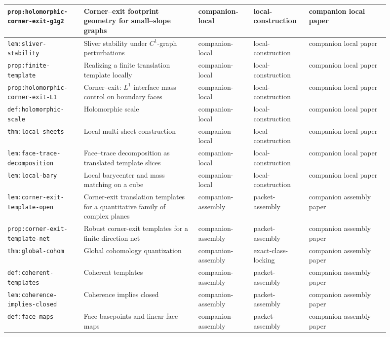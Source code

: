 \documentclass[11pt]{article}
\numberwithin{equation}{section}  %
\theoremstyle{plain}
\theoremstyle{definition}
\theoremstyle{remark}
\begin{document}
\begin{longtable}{|p{0.18\linewidth}|p{0.27\linewidth}|p{0.13\linewidth}|p{0.13\linewidth}|p{0.19\linewidth}|}
\texttt{prop:holomorphic-corner-exit-g1g2} & {Corner--exit footprint geometry for small--slope graphs} & companion-local & local-construction & companion local paper \\ \hline
\texttt{lem:sliver-stability} & Sliver stability under $C^1$-graph perturbations & companion-local & local-construction & companion local paper \\ \hline
\texttt{prop:finite-template} & Realizing a finite translation template locally & companion-local & local-construction & companion local paper \\ \hline
\texttt{prop:holomorphic-corner-exit-L1} & {Corner--exit: $L^1$ interface mass control on boundary faces} & companion-local & local-construction & companion local paper \\ \hline
\texttt{def:holomorphic-scale} & Holomorphic scale & companion-local & local-construction & companion local paper \\ \hline
\texttt{thm:local-sheets} & Local multi-sheet construction & companion-local & local-construction & companion local paper \\ \hline
\texttt{lem:face-trace-decomposition} & Face--trace decomposition as translated template slices & companion-local & local-construction & companion local paper \\ \hline
\texttt{lem:local-bary} & Local barycenter and mass matching on a cube & companion-local & local-construction & companion local paper \\ \hline
\texttt{lem:corner-exit-template-open} & Corner-exit translation templates for a quantitative family of complex planes & companion-assembly & packet-assembly & companion assembly paper \\ \hline
\texttt{prop:corner-exit-template-net} & Robust corner-exit templates for a finite direction net & companion-assembly & packet-assembly & companion assembly paper \\ \hline
\texttt{thm:global-cohom} & Global cohomology quantization & companion-assembly & exact-class-locking & companion assembly paper \\ \hline
\texttt{def:coherent-templates} & Coherent templates & companion-assembly & packet-assembly & companion assembly paper \\ \hline
\texttt{lem:coherence-implies-closed} & Coherence implies closed & companion-assembly & packet-assembly & companion assembly paper \\ \hline
\texttt{def:face-maps} & Face basepoints and linear face maps & companion-assembly & packet-assembly & companion assembly paper \\ \hline

\end{longtable}
\end{document}
